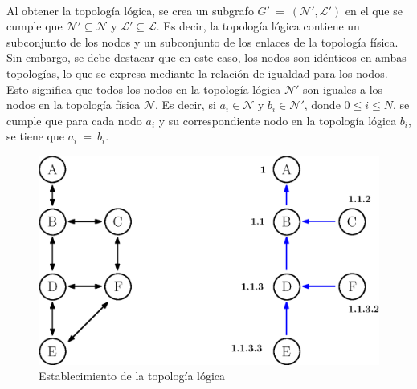 \\
Al obtener la topología lógica, se crea un subgrafo $G' \: = \: (\mathcal{N}', \mathcal{L}')$ en el que se cumple que $\mathcal{N}' \subseteq \mathcal{N}$ y $\mathcal{L}' \subseteq \mathcal{L}$. Es decir, la topología lógica contiene un subconjunto de los nodos y un subconjunto de los enlaces de la topología física. Sin embargo, se debe destacar que en este caso, los nodos son idénticos en ambas topologías, lo que se expresa mediante la relación de igualdad para los nodos. Esto significa que todos los nodos en la topología lógica $\mathcal{N}'$ son iguales a los nodos en la topología física $\mathcal{N}$. Es decir, si $a_{i} \in \mathcal{N}$ y $b_{i} \in \mathcal{N}'$, donde $0 \leq i \leq N$, se cumple que para cada nodo $a_{i}$ y su correspondiente nodo en la topología lógica $b_{i}$, se tiene que $a_{i} \: = \: b_{i}$.
\begin{figure}[ht]
    \centering
    \includegraphics[width=\textwidth]{archivos/img/dev/topo_logic.eps}
    \caption{Establecimiento de la topología lógica}
    \label{fig:topo_logic}
\end{figure}

